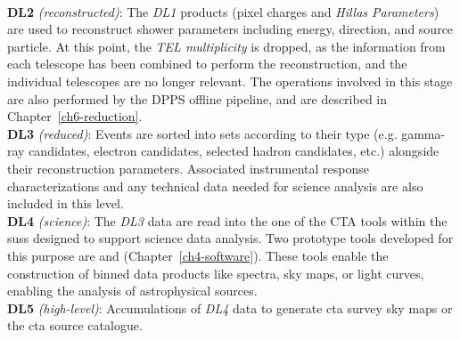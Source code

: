 \\[4pt]
\indent\textbf{DL2} \textit{(reconstructed)}: The \textit{DL1} products (pixel charges and \textit{Hillas Parameters}) are used to reconstruct shower parameters including energy, direction, and source particle. At this point, the \textit{TEL multiplicity} is dropped, as the information from each telescope has been combined to perform the reconstruction, and the individual telescopes are no longer relevant. The operations involved in this stage are also performed by the DPPS offline pipeline, and are described in Chapter~\ref{ch6-reduction}.
\\[4pt]
\indent\textbf{DL3} \textit{(reduced)}:
Events are sorted into sets according to their type (e.g. gamma-ray candidates, electron candidates, selected hadron
candidates, etc.) alongside their reconstruction parameters. Associated instrumental response characterizations and any technical data needed for
science analysis are also included in this level.
\\[4pt]
\indent\textbf{DL4} \textit{(science)}:
The \textit{DL3} data are read into the one of the CTA tools within the \gls{suss} designed to support science data analysis. Two prototype tools developed for this purpose are  and  (Chapter~\ref{ch4-software}). These tools enable the construction of binned data products like spectra, sky maps, or light curves, enabling the analysis of astrophysical sources.
\\[4pt]
\indent\textbf{DL5} \textit{(high-level)}:
Accumulations of \textit{DL4} data to generate \gls{cta} survey sky maps or the \gls{cta}
source catalogue.